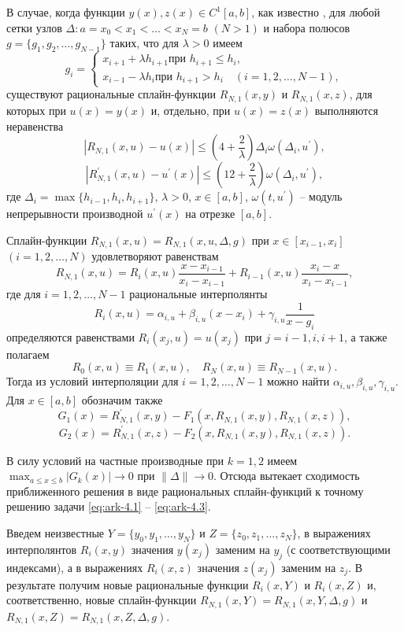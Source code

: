 В случае, когда функции  $y(x), z(x)\in C^1[a,b]$, как известно \cite{bib:ark-11},
 для любой сетки узлов $\Delta: a=x_0<x_1<\dots<x_N=b$  $(N>1)$ и
набора полюсов $g=\{g_1, g_2,\dots, g_{N-1}\}$ таких, что для  $\lambda>0$ имеем
$$
g_i=\begin{cases}
x_{i+1}+\lambda h_{i+1} \text{при } h_{i+1}\leqslant h_i,\\
x_{i-1}-\lambda h_i \text{при } h_{i+1}> h_i \quad (i=1,2,\dots,N-1),
\end{cases}
$$
существуют рациональные сплайн-функции $R_{N,1}(x,y)$ и $R_{N,1}(x,z)$,
 для которых при $u(x)=y(x)$ и, отдельно, при $u(x)=z(x)$ выполняются неравенства
\begin{equation*}\label{eq:ark-4.4}
|R_{N,1}(x,u)-u(x)|\leqslant
\left(4+\frac 2\lambda \right)\Delta_i \omega(\Delta_i,u^\prime),
\end{equation*}
\begin{equation*}\label{eq:ark-4.5}
|R^\prime_{N,1}(x,u)-u^\prime(x)|\leqslant
\left(12+\frac 2\lambda \right)\omega(\Delta_i,u^\prime),
\end{equation*}
где $\Delta_i=\max\{h_{i-1}, h_i, h_{i+1}\}$, $\lambda >0$, $x\in [a,b]$, $\omega(t, u^\prime)$
-- модуль непрерывности производной $u^\prime (x)$ на отрезке $[a,b]$.

Сплайн-функции $R_{N,1}(x,u)=R_{N,1}(x,u,\Delta,g)$ при $x\in [x_{i-1}, x_i]$
$(i=1,2,\dots,N)$ удовлетворяют равенствам
$$
R_{N,1}(x,u)=R_i(x,u) \frac{x-x_{i-1}}{x_i-x_{i-1}}+
R_{i-1}(x,u)\frac{x_i-x}{x_i-x_{i-1}},
$$
где для $i=1,2,\dots,N-1$ рациональные интерполянты
$$
R_i(x,u)=\alpha_{i,u}+\beta_{i,u} (x-x_i)+\gamma_{i,u} \frac 1{x-g_i}
$$
определяются равенствами $R_i(x_j,u)=u(x_j)$  при $j=i-1, i, i+1$, а также полагаем
$$
R_0(x,u)\equiv R_1(x,u),\quad R_N(x,u)\equiv R_{N-1}(x,u).
$$
Тогда из условий интерполяции для $i=1,2,\dots, N-1$ можно найти
$\alpha_{i,u}, \beta_{i,u}, \gamma_{i,u}$.
Для $x\in[a,b]$ обозначим также
$$
G_1(x)=R_{N,1}^\prime(x,y)-F_1(x, R_{N,1}(x,y),R_{N,1}(x,z)),
$$
$$
G_2(x)=R_{N,1}^\prime(x,z)-F_2(x, R_{N,1}(x,y),R_{N,1}(x,z)).
$$

В силу условий на частные производные при $k=1,2$ имеем
$\max_{a\leqslant x \leqslant b} |G_k(x)|\to 0$ при $\|\Delta\| \to 0$.
Отсюда вытекает сходимость приближенного решения в виде рациональных
сплайн-функций к точному решению задачи \eqref{eq:ark-4.1} -- \eqref{eq:ark-4.3}.

Введем неизвестные $Y=\{y_0,y_1, \dots,y_N\}$  и $Z=\{z_0,z_1, \dots, z_N\}$,
 в выражениях интерполянтов $R_i(x,y)$ значения $y(x_j)$ заменим на $y_j$
  (с соответствующими индексами), а в выражениях $R_i(x,z)$ значения $z(x_j)$
  заменим на $z_j$.
В результате получим новые рациональные функции $R_i(x,Y)$ и $R_i(x, Z)$ и,
соответственно, новые сплайн-функции $R_{N,1}(x,Y)=R_{N,1}(x,Y, \Delta,g)$
 и $R_{N,1} (x,Z)=R_{N,1}(x,Z,\Delta, g)$.

